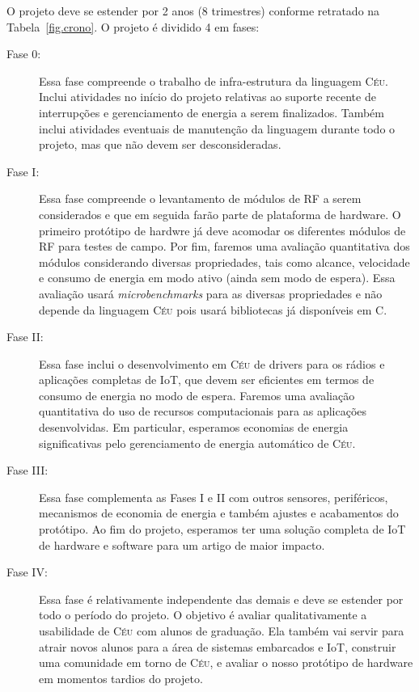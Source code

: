\documentclass[titlepage,12pt]{article}
\newcommand{\CEU}{\textsc{C\'{e}u}\xspace}
\begin{document}
O projeto deve se estender por 2 anos (8 trimestres) conforme retratado na
Tabela~\ref{fig.crono}.
%
O projeto é dividido 4 em fases:
%
\begin{description}
\item[Fase 0:]
Essa fase compreende o trabalho de infra-estrutura da linguagem \CEU.
Inclui atividades no início do projeto relativas ao suporte recente de
interrupções e gerenciamento de energia a serem finalizados.
Também inclui atividades eventuais de manutenção da linguagem durante todo o
projeto, mas que não devem ser desconsideradas.
%
\item[Fase I:]
Essa fase compreende o levantamento de módulos de RF a serem considerados e
que em seguida farão parte de plataforma de hardware.
O primeiro protótipo de hardwre já deve acomodar os diferentes módulos de RF
para testes de campo.
Por fim, faremos uma avaliação quantitativa dos módulos considerando diversas
propriedades, tais como alcance, velocidade e consumo de energia em modo ativo
(ainda sem modo de espera).
Essa avaliação usará \emph{microbenchmarks} para as diversas propriedades e não
depende da linguagem \CEU pois usará bibliotecas já disponíveis em C.
%
\item[Fase II:]
Essa fase inclui o desenvolvimento em \CEU de drivers para os rádios e
aplicações completas de IoT, que devem ser eficientes em termos de consumo de
energia no modo de espera.
Faremos uma avaliação quantitativa do uso de recursos computacionais para as
aplicações desenvolvidas.
Em particular, esperamos economias de energia significativas pelo gerenciamento
de energia automático de \CEU.
%
\item[Fase III:]
Essa fase complementa as Fases I e II com outros sensores, periféricos,
mecanismos de economia de energia e também ajustes e acabamentos do protótipo.
Ao fim do projeto, esperamos ter uma solução completa de IoT de hardware e
software para um artigo de maior impacto.
%
\item[Fase IV:]
Essa fase é relativamente independente das demais e deve se estender por todo o
período do projeto.
O objetivo é avaliar qualitativamente a usabilidade de \CEU com alunos de
graduação.
Ela também vai servir para atrair novos alunos para a área de sistemas
embarcados e IoT, construir uma comunidade em torno de \CEU, e avaliar o nosso
protótipo de hardware em momentos tardios do projeto.
\end{description}
\end{document}
